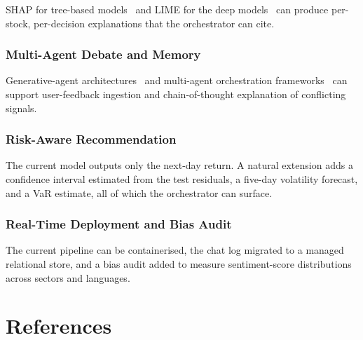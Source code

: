 \documentclass[12pt,a4paper,oneside]{report}
\begin{document}
\ac{SHAP} for tree-based models~\cite{lundberg2017shap} and
\ac{LIME} for the deep models~\cite{ribeiro2016lime} can produce
per-stock, per-decision explanations that the orchestrator can
cite.

\subsection{Multi-Agent Debate and Memory}

Generative-agent architectures~\cite{park2023generative} and
multi-agent orchestration frameworks~\cite{wu2023autogen} can
support user-feedback ingestion and chain-of-thought explanation
of conflicting signals.

\subsection{Risk-Aware Recommendation}

The current model outputs only the next-day return. A natural
extension adds a confidence interval estimated from the test
residuals, a five-day volatility forecast, and a \ac{VaR}
estimate, all of which the orchestrator can surface.

\subsection{Real-Time Deployment and Bias Audit}

The current pipeline can be containerised, the chat log migrated
to a managed relational store, and a bias audit added to measure
sentiment-score distributions across sectors and languages.

\chapter*{References}
\end{document}

